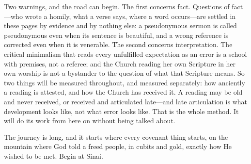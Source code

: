 Two warnings, and the road can begin. The first concerns fact.
Questions of fact---who wrote a homily, what a verse says, where a word
occurs---are settled in these pages by evidence and by nothing else: a
pseudonymous sermon is called pseudonymous even when its sentence is
beautiful, and a wrong reference is corrected even when it is
venerable. The second concerns interpretation. The critical
minimalism that reads every unfulfilled expectation as an error is a
school with premises, not a referee; and the Church reading her own
Scripture in her own worship is not a bystander to the question of what
that Scripture means. So two things will be measured throughout, and
measured separately: how anciently a reading is attested, and how the
Church has received it. A reading may be old and never received, or
received and articulated late---and late articulation is what
development looks like, not what error looks like. That is the whole
method. It will do its work from here on without being talked about.

The journey is long, and it starts where every
covenant thing starts, on the mountain where God told a freed people,
in cubits and gold, exactly how He wished to be met. Begin at Sinai.
